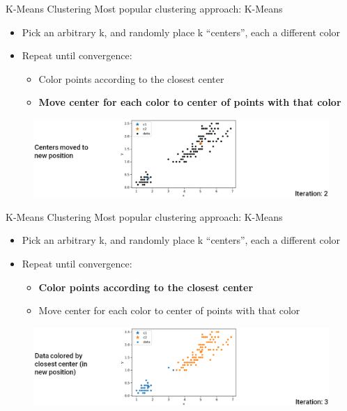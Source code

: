 \documentclass[aspectratio=169]{../latex_main/tntbeamer}  %
\begin{document}
	
	
	\begin{frame}{K-Means Clustering}
	    Most popular clustering approach: K-Means
	    \begin{itemize}
	        \item Pick an arbitrary k, and randomly place k “centers”, each a different color
	        \item Repeat until convergence:
	        \begin{itemize}
	            \item Color points according to the closest center
	            \item \textbf{Move center for each color to center of points with that color}
	        \end{itemize}
	    \end{itemize}
	    \begin{figure}
	        \centering
	        \includegraphics[scale=.39]{Bild13}
	    \end{figure}
	\end{frame}
	
	
	
	
	\begin{frame}{K-Means Clustering}
	    Most popular clustering approach: K-Means
	    \begin{itemize}
	        \item Pick an arbitrary k, and randomly place k “centers”, each a different color
	        \item Repeat until convergence:
	        \begin{itemize}
	            \item \textbf{Color points according to the closest center}
	            \item Move center for each color to center of points with that color
	        \end{itemize}
	    \end{itemize}
	    \begin{figure}
	        \centering
	        \includegraphics[scale=.38]{Bild14}
	    \end{figure}
	\end{frame}
	
\end{document}
